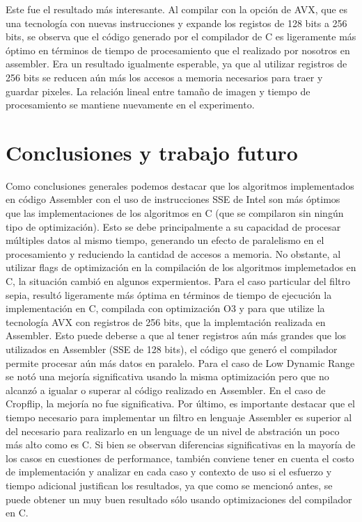 \documentclass[a4paper]{article}
\begin{document}
Este fue el resultado más interesante. Al compilar con la opción de AVX, que es una tecnología con nuevas instrucciones y expande los registos de 128 bits a 256 bits, se observa que el código generado por el compilador de C es ligeramente más óptimo en términos de tiempo de procesamiento que el realizado por nosotros en assembler. Era un resultado igualmente esperable, ya que al utilizar registros de 256 bits se reducen aún más los accesos a memoria necesarios para traer y guardar pixeles. La relación lineal entre tamaño de imagen y tiempo de procesamiento se mantiene nuevamente en el experimento.  
\newline

\section{Conclusiones y trabajo futuro}

Como conclusiones generales podemos destacar que los algoritmos implementados
en código Assembler con el uso de instrucciones SSE de Intel son más óptimos que
las implementaciones de los algoritmos en C (que se compilaron sin ningún 
tipo de optimización). Esto se debe principalmente a
su capacidad de procesar múltiples datos al mismo tiempo, generando un efecto
de paralelismo en el procesamiento y reduciendo la cantidad de accesos a memoria.
No obstante, al utilizar flags de optimización en la compilación de los algoritmos
implemetados en C, la situación cambió en algunos expermientos. Para el caso particular del filtro sepia, resultó ligeramente más óptima en términos de tiempo de ejecución
la implementación en C, compilada con optimización O3 y para que utilize la tecnología AVX con registros de 256 bits, que la implemtación realizada en Assembler. Esto puede deberse a que al tener registros aún más grandes que los utilizados en Assembler (SSE de 128 bits), el código que generó el compilador permite procesar aún más datos en paralelo. 
Para el caso de Low Dynamic Range se notó una mejoría significativa usando la misma optimización pero que no alcanzó a igualar o superar al código realizado en Assembler. En el caso de Cropflip, la mejoría no fue significativa.
Por último, es importante destacar que el tiempo necesario para implementar un filtro en lenguaje Assembler es superior al del necesario para realizarlo en un lenguage de un nivel de abstración un poco más alto como es C. Si bien se observan diferencias significativas en la mayoría de los casos en cuestiones de performance, también conviene tener en cuenta el costo de implementación y analizar en cada caso y contexto de uso si el esfuerzo y tiempo adicional justifican los resultados, ya que como se mencionó antes, se puede obtener un muy buen resultado sólo usando optimizaciones del compilador en C.   
\end{document}
